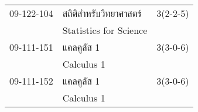 \begin{longtable}{p{}p{}r{}}
09-122-104 & สถิติสำหรับวิทยาศาสตร์ & 3(2-2-5)\\
 & Statistics for Science & \\[1mm]
09-111-151 & แคลคูลัส 1 & 3(3-0-6)\\
 & Calculus 1 & \\[1mm]
09-111-152 & แคลคูลัส 1 & 3(3-0-6)\\
 & Calculus 1 & \\[1mm]
\end{longtable}
